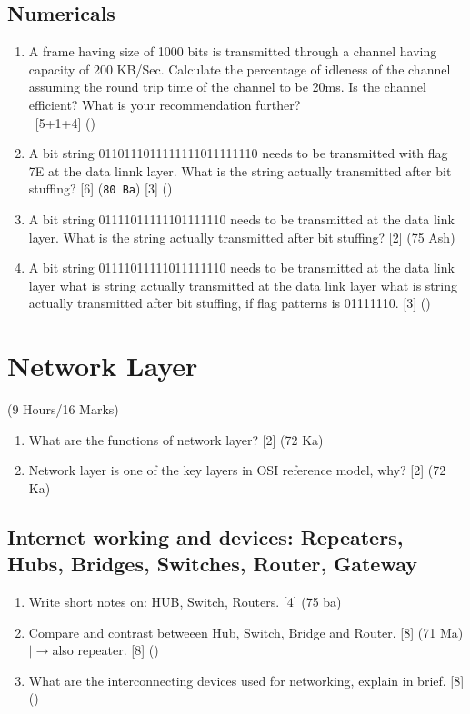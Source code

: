 \documentclass[12pt]{article}
\newcommand{\lb}{\\$\left|\rightarrow\right.$}
\newcommand{\enter}{\\\textcolor{white}{1}}
\begin{document}
	\subsection{Numericals}
		\begin{enumerate}[noitemsep, topsep=0pt]
			\item A frame having size of 1000 bits is transmitted through a channel having capacity of 200 KB/Sec. Calculate the percentage of idleness of the channel assuming the round trip time of the channel to be 20ms. Is the channel efficient? What is your recommendation further?
			\enter\hfill [5+1+4] () 

			\item A bit string 0110111011111111011111110 needs to be transmitted with flag 7E at the data linnk layer. What is the string actually transmitted after bit stuffing? \hfill [6] (\texttt{80 Ba}) [3] ()

			\item A bit string 01111011111101111110 needs to be transmitted at the data link layer. What is the string actually transmitted after bit stuffing? \hfill [2] (75 Ash)

			\item A bit string 01111011111011111110 needs to be transmitted at the data link layer what is string actually transmitted at the data  link layer what is string actually transmitted after bit stuffing, if flag patterns is 01111110. \hfill [3] ()
		\end{enumerate}

	\pagebreak

\section{Network Layer}
	\begin{center}(9 Hours/16 Marks)\end{center}
	\begin{enumerate}[noitemsep, topsep=0pt]
		\item What are the functions of network layer? \hfill [2] (72 Ka)
		\item Network layer is one of the key layers in OSI reference model, why? \hfill [2] (72 Ka)
	\end{enumerate}

	\subsection{Internet working and devices: Repeaters, Hubs, Bridges, Switches, Router, Gateway}
		\begin{enumerate}[noitemsep, topsep=0pt]
			\item Write short notes on: HUB, Switch, Routers. \hfill [4] (75 ba)

			\item Compare and contrast betweeen Hub, Switch, Bridge and Router. \hfill [8] (71 Ma)
			\lb also repeater. \hfill [8] ()

			\item What are the interconnecting devices used for networking, explain in brief. \hfill [8] ()
		\end{enumerate}
\end{document}
